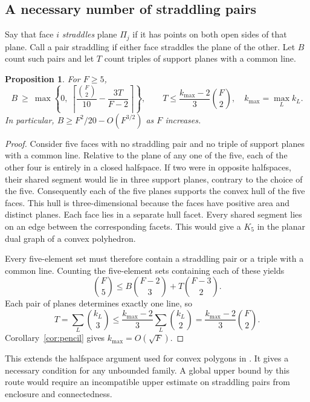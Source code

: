 \documentclass[11pt,a4paper]{article}
\newtheorem{proposition}[theorem]{Proposition}
\theoremstyle{definition}
\begin{document}
\subsection{A necessary number of straddling pairs}

Say that face $i$ \emph{straddles} plane $\Pi_j$ if it has points on both
open sides of that plane. Call a pair straddling if either face straddles
the plane of the other. Let $B$ count such pairs and let $T$ count triples
of support planes with a common line.

\begin{proposition}\label{prop:straddling}
For $F\geq5$,
\[
 B \ \geq\ \max\left\{0,\
 \left\lceil\frac{\binom{F}{2}}{10}-\frac{3T}{F-2}\right\rceil\right\},
 \qquad
 T\leq\frac{k_{\max}-2}{3}\binom{F}{2},
 \quad
 k_{\max}=\max_L k_L .
\]
In particular, $B\geq F^2/20-O(F^{3/2})$ as $F$ increases.
\end{proposition}

\begin{proof}
Consider five faces with no straddling pair and no triple of support
planes with a common line. Relative to the plane of any one of the
five, each of the other four is entirely in a closed halfspace. If two
were in opposite halfspaces, their shared segment would lie in three
support planes, contrary to the choice of the five. Consequently each
of the five planes supports the convex hull of the five faces. This
hull is three-dimensional because the faces have positive area and
distinct planes. Each face lies in a separate hull facet. Every shared
segment lies on an edge between the corresponding facets. This would
give a $K_5$ in the planar dual graph of a convex polyhedron.

Every five-element set must therefore contain a straddling pair or a
triple with a common line. Counting the five-element sets containing
each of these yields
\[
 \binom{F}{5}\leq B\binom{F-2}{3}+T\binom{F-3}{2}.
\]
Each pair of planes determines exactly one line, so
\[
 T=\sum_L \binom{k_L}{3}
   \leq \frac{k_{\max}-2}{3}\sum_L\binom{k_L}{2}
   =\frac{k_{\max}-2}{3}\binom{F}{2}.
\]
Corollary~\ref{cor:pencil} gives $k_{\max}=O(\sqrt F)$.
\end{proof}

This extends the halfspace argument used for convex polygons in
\cite{ArsenevaEtAl2024}. It gives a necessary condition for any unbounded
family. A global upper bound by this route would require an incompatible
upper estimate on straddling pairs from enclosure and connectedness.
\end{document}
